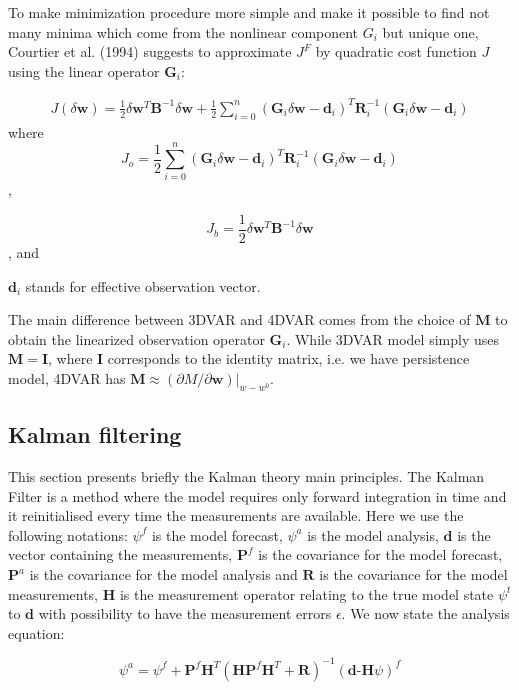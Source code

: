 \documentclass[a4,12pt]{article}
\numberwithin{equation}{section}
\begin{document}
To make minimization procedure more simple and make it possible to find not many minima which come from the nonlinear component $G_{i}$ but unique one, Courtier et al. (1994) suggests to approximate $J^{F}$ by quadratic cost function $J$ using the linear operator $\mathbf {G}_{i}$:

\begin{align}
J(\delta \mathbf {w}) = \frac{1}{2} \delta \mathbf {w}^{T} \mathbf {B}^{-1} \delta \mathbf {w} + \frac{1}{2} \sum_{i=0}^{n}(\mathbf {G}_{i} \delta \mathbf {w} - \mathbf {d}_{i})^{T}\mathbf {R}_{i}^{-1}(\mathbf {G}_{i} \delta \mathbf {w} - \mathbf {d}_{i})
\end{align}
where $$J_{o} = \frac{1}{2} \sum_{i=0}^{n}(\mathbf {G}_{i} \delta \mathbf {w} - \mathbf {d}_{i})^{T}\mathbf {R}_{i}^{-1}(\mathbf {G}_{i} \delta \mathbf {w} - \mathbf {d}_{i})$$,

$$J_{b} = \frac{1}{2} \delta \mathbf {w}^{T} \mathbf {B}^{-1} \delta \mathbf {w}$$, and 

$\mathbf {d}_{i}$ stands for effective observation vector.

The main difference between 3DVAR and 4DVAR comes from the choice of $\mathbf{M}$ to obtain the linearized observation operator $\mathbf {G}_{i}$. While 3DVAR model simply uses $\mathbf {M} = \mathbf {I}$, where $\mathbf {I}$ corresponds to the identity matrix, i.e. we have persistence model, 4DVAR has $\mathbf {M} \approx (\partial M/\partial \mathbf {w})|_{w-w^{b}}$.

\subsection{Kalman filtering}
This section presents briefly the Kalman theory main principles.
The Kalman Filter is a method where the model requires only forward integration in time and it reinitialised every time the measurements are available. Here we use the following notations: $\psi^{f}$ is the model forecast, $\psi^{a}$ is the model analysis, $\textbf{d}$ is the vector containing the measurements, $\textbf{P}^{f}$ is the covariance for the model forecast, $\textbf{P}^{a}$ is the covariance for the model analysis and $\textbf{R}$ is the covariance for the model measurements, $\textbf{H}$ is the measurement operator relating to the true model state $\psi ^{t}$ to $\textbf{d}$ with possibility to have the measurement errors $\epsilon$. We now state the analysis equation:

$$\psi ^{a} = \psi ^{f} + \textbf{P} ^{f}\textbf{H} ^{T}(\textbf{HP} ^{f}\textbf{H} ^{T}+\textbf{R}) ^{-1}(\textbf{d-H}\psi) ^{f}$$
\end{document}
